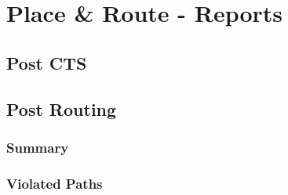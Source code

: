 \chapter{Place \& Route - Reports}
\label{pr_rpt}

\section{Post CTS}
	
	
\section{Post Routing}
\subsection{Summary}
	

\subsection{Violated Paths}
